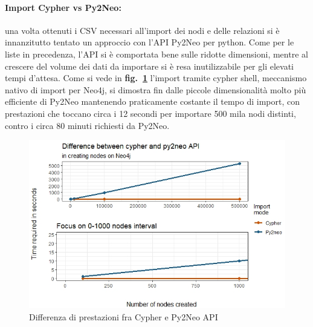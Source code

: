 \documentclass[fleqn,10pt]{SelfArx} %
\begin{document}
{{\paragraph{Import Cypher vs Py2Neo:} una volta ottenuti i CSV necessari all'import dei nodi e delle relazioni si è innanzitutto tentato un approccio con l'API Py2Neo per python. 
Come per le liste in precedenza, l'API si è comportata bene sulle ridotte dimensioni, mentre al crescere del volume dei dati da importare si è resa inutilizzabile per gli elevati tempi d'attesa. 
Come si vede in \textbf{fig.~\ref{plot_cypher_py2neo}} l'import tramite cypher shell, meccanismo nativo di import per Neo4j, si dimostra fin dalle piccole dimensionalità molto più efficiente di Py2Neo mantenendo praticamente costante il tempo di import, con prestazioni che toccano circa i 12 secondi per importare 500 mila nodi distinti, contro i circa 80 minuti richiesti da Py2Neo.
\begin{figure}
\centering
\includegraphics[scale=0.54]{viz_benchmark_cypher_py2neo.jpeg}
\vspace*{0.01cm}
\caption{\footnotesize \label{plot_cypher_py2neo} Differenza di prestazioni fra Cypher e Py2Neo API}
\end{figure}
}}
\end{document}
